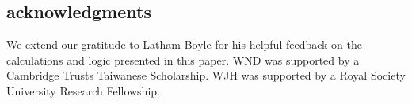 \documentclass[%
 reprint,
 amsmath,amssymb,
 prl,
]{revtex4-2}
\begin{document}
\begin{acknowledgments}
\section{acknowledgments}
We extend our gratitude to Latham Boyle for his helpful feedback on the calculations and logic presented in this paper. WND was supported by a Cambridge Trusts Taiwanese Scholarship. WJH was supported by a Royal Society University Research Fellowship. 

\end{acknowledgments}






\let\oldbibitem\bibitem
\renewcommand{\bibitem}{%
    \renewcommand{\doi}[1]{doi: ##1}%
    \let\bibitem\oldbibitem%
    \oldbibitem%
}

\end{document}
